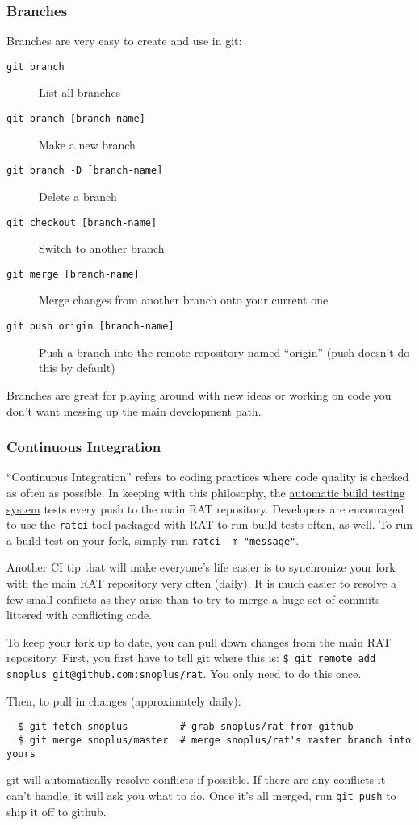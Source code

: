 \documentclass{article}
\begin{document}
\subsubsection{Branches}
Branches are very easy to create and use in git:
\begin{description}
\item[{\tt git branch}] List all branches
\item[{\tt git branch [branch-name]}] Make a new branch
\item[{\tt git branch -D [branch-name]}] Delete a branch
\item[{\tt git checkout [branch-name]}] Switch to another branch
\item[{\tt git merge [branch-name]}] Merge changes from another branch onto your current one
\item[{\tt git push origin [branch-name]}] Push a branch into the remote repository named ``origin'' (push doesn't do this by default)
\end{description}
Branches are great for playing around with new ideas or working on code you don't want messing up the main development path.

\subsubsection{Continuous Integration}
``Continuous Integration'' refers to coding practices where code quality is checked as often as possible. In keeping with this philosophy, the \href{http://ratbuild.hep.upenn.edu/snoplus/build}{automatic build testing system} tests every push to the main RAT repository. Developers are encouraged to use the {\tt ratci} tool packaged with RAT to run build tests often, as well. To run a build test on your fork, simply run {\tt ratci -m "message"}.

Another CI tip that will make everyone's life easier is to synchronize your fork with the main RAT repository very often (daily). It is much easier to resolve a few small conflicts as they arise than to try to merge a huge set of commits littered with conflicting code.

To keep your fork up to date, you can pull down changes from the main RAT repository. First, you first have to tell git where this is: {\tt \$ git remote add snoplus git@github.com:snoplus/rat}. You only need to do this once.

Then, to pull in changes (approximately daily):
\begin{verbatim}
  $ git fetch snoplus         # grab snoplus/rat from github
  $ git merge snoplus/master  # merge snoplus/rat's master branch into yours
\end{verbatim}
git will automatically resolve conflicts if possible. If there are any conflicts it can't handle, it will ask you what to do. Once it's all merged, run {\tt git push} to ship it off to github.\\
\end{document}

